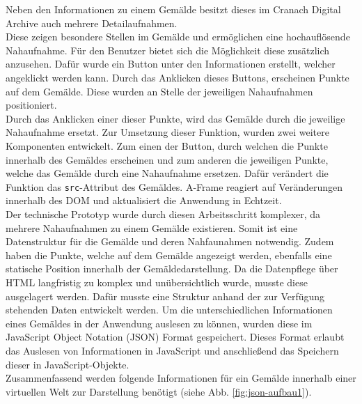 \documentclass[a4paper,12pt,oneside]{article}
\begin{document}
        Neben den Informationen zu einem Gemälde besitzt dieses im Cranach
        Digital Archive auch mehrere Detailaufnahmen. \\
        Diese zeigen besondere
        Stellen im Gemälde und ermöglichen eine hochauflösende Nahaufnahme.
        Für den Benutzer bietet sich die Möglichkeit diese zusätzlich anzusehen.
        Dafür wurde ein Button unter den Informationen erstellt,
        welcher angeklickt werden kann. Durch das Anklicken dieses Buttons, 
        erscheinen Punkte auf dem Gemälde. Diese wurden an Stelle der 
        jeweiligen Nahaufnahmen positioniert. \\
        Durch das Anklicken einer 
        dieser Punkte, wird das Gemälde durch die jeweilige Nahaufnahme ersetzt. 
        Zur Umsetzung dieser Funktion, wurden zwei weitere Komponenten entwickelt. 
        Zum einen der Button, durch welchen die Punkte innerhalb
        des Gemäldes erscheinen und zum anderen die jeweiligen Punkte, welche
        das Gemälde durch eine Nahaufnahme ersetzen. Dafür verändert die Funktion
        das \texttt{src}-Attribut des Gemäldes. A-Frame reagiert
        auf Veränderungen innerhalb des DOM und aktualisiert die Anwendung
        in Echtzeit. \\
        Der technische Prototyp wurde durch diesen Arbeitsschritt komplexer,
        da mehrere Nahaufnahmen zu einem Gemälde existieren. Somit ist eine
        Datenstruktur für die Gemälde und deren Nahfaunahmen notwendig.
        Zudem haben die Punkte, welche auf dem Gemälde 
        angezeigt werden, ebenfalls eine statische Position innerhalb der
        Gemäldedarstellung. Da die Datenpflege über HTML langfristig 
        zu komplex und
        unübersichtlich wurde, musste diese ausgelagert werden.
        Dafür musste eine Struktur anhand der zur Verfügung stehenden
        Daten entwickelt werden.        
        Um die unterschiedlichen Informationen eines Gemäldes in der Anwendung 
        auslesen zu können, wurden diese im
        JavaScript Object Notation (JSON) Format gespeichert. 
        Dieses Format erlaubt das
        Auslesen von Informationen in JavaScript und anschließend das Speichern dieser
        in JavaScript-Objekte. \\
        Zusammenfassend werden folgende Informationen für
        ein Gemälde innerhalb einer virtuellen Welt zur Darstellung benötigt
        (siehe Abb. \ref{fig:json-aufbau1}).
\end{document}
